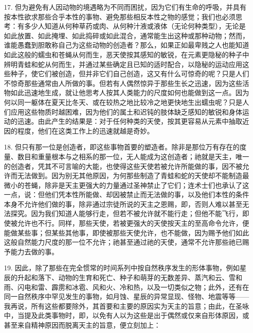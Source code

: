 17. 但为避免有人因动物的境遇略为不同而困扰，因为它们有生命的呼吸，并具有按本性欲求那些合乎本性的事物、避免那些相反本性之物的感觉；我们也必须思考：有多少人知道从何种草药或肉、从何种汁液或液体（无论何种类型），无论是如此放置、如此掩埋、如此捣碎或如此混合，通常能生出这种或那种动物；然而，谁能愚蠢到胆敢称自己为这些动物的创造者？那么，如果正如最卑贱之人也能知道如此这般的蠕虫和苍蝇从何而生，恶天使按其感知的敏锐，在元素更隐秘的种子中辨明青蛙和蛇从何而生，并通过某些确定且已知的适时配合，以隐秘的运动应用这些种子，使它们被创造，但并非它们自己创造，这又有什么可惊奇的呢？只是人们不惊奇那些通常由人所做的事。但若有人偶然惊异于那些生长之迅速，因为这些活物如此迅速地生成，就让他思考人按其人类能力的尺度如何也能做到这一点。因为何以同一躯体在夏天比冬天、或在较热之地比较冷之地更快地生出蠕虫呢？只是人们应用这些物质时越困难，因为他们的属土和迟钝的肢体缺乏感知的敏锐和身体运动的迅速。由此产生的结果是：对于任何种类的天使，按其更容易从元素中抽取近因的程度，他们在这类工作上的迅速就越是奇妙。\par

18. 但只有那一位是创造者，即这些事物首要的塑造者。除非是那位万有存在的度量、数目和重量根本与之相系的那一位，无人能成为这创造者；祂就是天主，唯一的创造者，凭其不可言喻的大能，也使得这些天使若被允许所能做的事，因不被允许而无法做到。因为别无其他原因，为何那些制造了青蛙和蛇的天使却不能制造最微小的苍蝇，除非是天主更强大的力量通过圣神禁止了它们；连术士们也承认了这一点，说：但他们凭本性所能做、却因被禁止而无法做的事，以及他们本性的条件本身不允许他们做的事，除非通过宗徒所说的天主之恩赐，即，否则人难以甚至无法探究。因为我们知道人能够行走，但若不被允许就不能行走；但他不能飞行，即使被允许也不行。同样，那些天使，若被更强大的天使按天主的至高命令允许，便能做某些事；但某些其他事，即使被那些天使允许，也不能做，因为赐予他们如此这般自然能力尺度的那一位不允许；祂甚至通过祂的天使，通常不允许那些祂已赐予能力去做的事。\par

19. 因此，除了那些在完全惯常的时间系列中按自然秩序发生的形体事物，例如星辰的升起和落下、动物的生育和死亡、种子和萌芽的无数差异、蒸汽和云、雪和雨、闪电和雷、霹雳和冰雹、风和火、冷和热，以及一切类似之物；此外，还有在同一自然秩序中罕见发生的事物，如月蚀、星辰的异常显现、怪物、地震等等——我再说，所有这些都要除外，其首要和主要的原因实为天主的旨意；由此，在圣咏中，当提及此类事物时，即，以免有人以为这些是出于偶然或仅来自形体原因，或甚至来自精神原因而脱离天主的旨意，便立刻加上：\par

